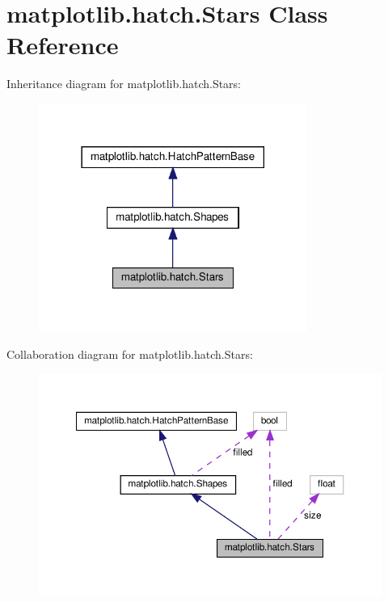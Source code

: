 \hypertarget{classmatplotlib_1_1hatch_1_1Stars}{}\section{matplotlib.\+hatch.\+Stars Class Reference}
\label{classmatplotlib_1_1hatch_1_1Stars}


Inheritance diagram for matplotlib.\+hatch.\+Stars\+:
\nopagebreak
\begin{figure}[H]
\begin{center}
\leavevmode
\includegraphics[width=249pt]{classmatplotlib_1_1hatch_1_1Stars__inherit__graph}
\end{center}
\end{figure}


Collaboration diagram for matplotlib.\+hatch.\+Stars\+:
\nopagebreak
\begin{figure}[H]
\begin{center}
\leavevmode
\includegraphics[width=350pt]{classmatplotlib_1_1hatch_1_1Stars__coll__graph}
\end{center}
\end{figure}
